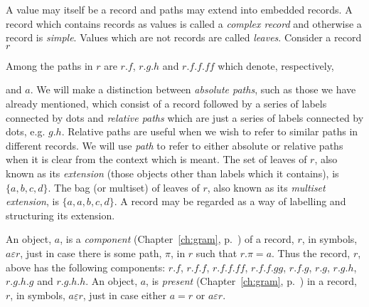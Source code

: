A value may itself be a record and paths may extend into embedded
records.  A record which contains records as values is called a {\it
  complex record\/} and otherwise a record is {\it simple\/}.  Values which are not records are called {\it
  leaves\/}.  Consider a record $r$ \label{pg:record}
\begin{display}
\end{display}
Among the paths in $r$ are $r.f$, $r.g.h$ and $r.f.f.\mathit{ff}$ which denote,
respectively, 
\begin{display}
\end{display}
\begin{display} 
\end{display}
and $a$.  We will make a distinction between \textit{absolute paths},
such as those we have already mentioned, which consist of a record
followed by a series of labels connected by dots and \textit{relative
  paths} which are just a series of labels connected by dots,
e.g. $g.h$.  Relative paths are useful when we wish to refer to
similar paths in different records.  We will use \textit{path} to
refer to either absolute or relative paths when it is clear from the
context which is meant.  The set of leaves of $r$, also known as its {\it
  extension\/} (those objects other than labels which it contains), is
$\{a,b,c,d\}$.  The bag (or multiset) of leaves of $r$, also known as
its {\it multiset extension\/}, is $\{a,a,b,c,d\}$.  A record may be
regarded as a way of labelling and structuring its extension.

An object, $a$, is a \textit{component} (Chapter~\ref{ch:gram}, p.~\pageref{pg:component}) of a record, $r$, in symbols,
$a\varepsilon r$, just in case there is some path, $\pi$, in $r$ such
that $r.\pi=a$.  Thus the record, $r$, above has the following
components: $r.f$, $r.f.f$, $r.f.f.\mathit{ff}$,
$r.f.f.\mathit{gg}$, $r.f.g$, $r.g$, $r.g.h$, $r.g.h.g$ and
$r.g.h.h$. An object, $a$, is \textit{present} (Chapter~\ref{ch:gram},
p.~\pageref{pg:present}) in a record, $r$, in
symbols, $a\underline{\varepsilon} r$, just in case either $a=r$ or
$a\varepsilon r$.

